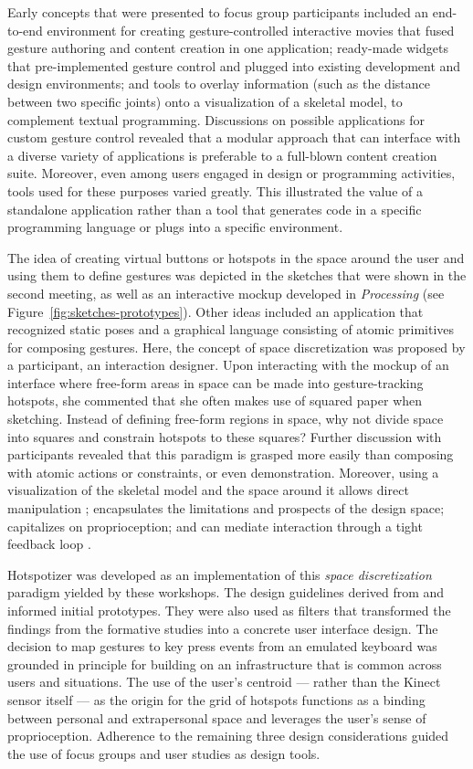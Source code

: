 Early concepts that were presented to focus group participants included an end-to-end environment for creating gesture-controlled interactive movies that fused gesture authoring and content creation in one application; ready-made widgets that pre-implemented gesture control and plugged into existing development and design environments; and tools to overlay information (such as the distance between two specific joints) onto a visualization of a skeletal model, to complement textual programming. Discussions on possible applications for custom gesture control revealed that a modular approach that can interface with a diverse variety of applications is preferable to a full-blown content creation suite. Moreover, even among users engaged in design or programming activities, tools used for these purposes varied greatly. This illustrated the value of a standalone application rather than a tool that generates code in a specific programming language or plugs into a specific environment.

The idea of creating virtual buttons or hotspots in the space around the user and using them to define gestures was depicted in the sketches that were shown in the second meeting, as well as an interactive mockup developed in \emph{Processing} (see Figure~\ref{fig:sketches-prototypes}). Other ideas included an application that recognized static poses and a graphical language consisting of atomic primitives for composing gestures. Here, the concept of space discretization was proposed by a participant, an interaction designer. Upon interacting with the mockup of an interface where free-form areas in space can be made into gesture-tracking hotspots, she commented that she often makes use of squared paper when sketching. Instead of defining free-form regions in space, why not divide space into squares and constrain hotspots to these squares? Further discussion with participants revealed that this paradigm is grasped more easily than composing with atomic actions or constraints, or even demonstration. Moreover, using a visualization of the skeletal model and the space around it allows direct manipulation \parencite{Hutchins:1985}; encapsulates the limitations and prospects of the design space; capitalizes on proprioception; and can mediate interaction through a tight feedback loop \parencite{Wilson:2012}.

Hotspotizer was developed as an implementation of this \emph{space discretization} paradigm yielded by these workshops. The design guidelines derived from \textcite{Olsen:2007} and \textcite{Shoemaker:2010} informed initial prototypes. They were also used as filters that transformed the findings from the formative studies into a concrete user interface design. The decision to map gestures to key press events from an emulated keyboard was grounded in  principle for building on an infrastructure that is common across users and situations. The use of the user's centroid --- rather than the Kinect sensor itself --- as the origin for the grid of hotspots functions as a binding between personal and extrapersonal space and leverages the user's sense of proprioception. Adherence to the remaining three design considerations guided the use of focus groups and user studies as design tools.


